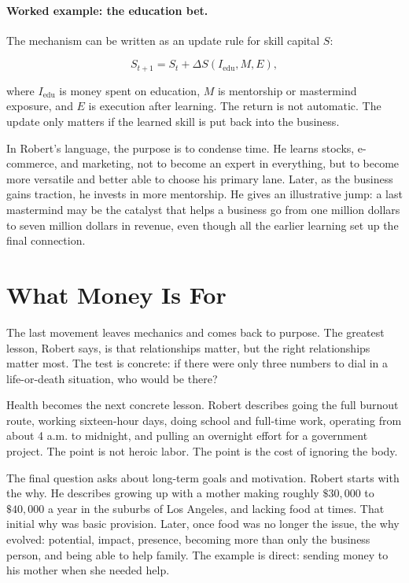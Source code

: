 \paragraph{Worked example: the education bet.}
The mechanism can be written as an update rule for skill capital \(S\):

\begin{equation}
S_{t+1} = S_t + \Delta S(I_{\mathrm{edu}},M,E),
\end{equation}

where \(I_{\mathrm{edu}}\) is money spent on education, \(M\) is mentorship or mastermind exposure, and \(E\) is execution after learning. The return is not automatic. The update only matters if the learned skill is put back into the business.

In Robert's language, the purpose is to condense time. He learns stocks, e-commerce, and marketing, not to become an expert in everything, but to become more versatile and better able to choose his primary lane. Later, as the business gains traction, he invests in more mentorship. He gives an illustrative jump: a last mastermind may be the catalyst that helps a business go from one million dollars to seven million dollars in revenue, even though all the earlier learning set up the final connection.

\section{What Money Is For}

The last movement leaves mechanics and comes back to purpose. The greatest lesson, Robert says, is that relationships matter, but the right relationships matter most. The test is concrete: if there were only three numbers to dial in a life-or-death situation, who would be there?

Health becomes the next concrete lesson. Robert describes going the full burnout route, working sixteen-hour days, doing school and full-time work, operating from about 4 a.m. to midnight, and pulling an overnight effort for a government project. The point is not heroic labor. The point is the cost of ignoring the body.

The final question asks about long-term goals and motivation. Robert starts with the why. He describes growing up with a mother making roughly \( \$30{,}000 \) to \( \$40{,}000 \) a year in the suburbs of Los Angeles, and lacking food at times. That initial why was basic provision. Later, once food was no longer the issue, the why evolved: potential, impact, presence, becoming more than only the business person, and being able to help family. The example is direct: sending money to his mother when she needed help.

